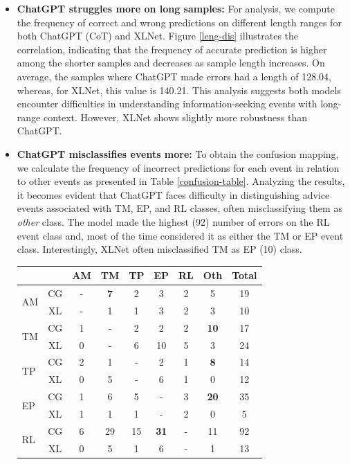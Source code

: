 \documentclass[letterpaper]{article} %
\begin{document}
\begin{itemize}
\item \textbf{ChatGPT struggles more on long samples:} For analysis, we compute the frequency of correct and wrong predictions on different length ranges for both ChatGPT (CoT) and XLNet. Figure \ref{leng-dis} illustrates the correlation, indicating that the frequency of accurate prediction is higher among the shorter samples and decreases as sample length increases. On average, the samples where ChatGPT made errors had a length of 128.04, whereas, for XLNet, this value is 140.21. This analysis suggests both models encounter difficulties in understanding information-seeking events with long-range context. However, XLNet shows slightly more robustness than ChatGPT. 

\item \textbf{ChatGPT misclassifies events more:} To obtain the confusion mapping, we calculate the frequency of incorrect predictions for each event in relation to other events as presented in Table \ref{confusion-table}. Analyzing the results, it becomes evident that ChatGPT faces difficulty in distinguishing advice events associated with TM, EP, and RL classes, often misclassifying them as \textit{other} class. The model made the highest (92) number of errors on the RL event class and, most of the time considered it as either the TM or EP event class. Interestingly, XLNet often misclassified TM as EP (10) class.   

\begin{table}[h!]
\renewcommand*{\arraystretch}{0.91}
\centering
\footnotesize
\begin{tabular}
{lc|cccccc|c}
& &{\textbf{AM}}& {\textbf{TM}}& {\textbf{TP}} & {\textbf{EP}} & {\textbf{RL}} & \textbf{Oth} & Total\\
\midrule        
 \multirow{2}{*}{AM} & CG &-  & \textbf{7} & 2 & 3 & 2 & 5 & 19\\
 & XL & - & 1 & 1 & 3 & 2 & 3 & 10 \\
\midrule

 \multirow{2}{*}{TM} &CG & 1 & - & 2 & 2 & 2 & \textbf{10} & 17\\
 & XL& 0 & - & 6 & {10} & 5 & 3 & {24} \\

\midrule
 \multirow{2}{*}{TP} &CG & 2 & 1 & - & 2 & 1 & \textbf{8}  & 14\\
&XL & 0 & 5 & - & 6 & 1 & 0 & 12 \\
\midrule
 \multirow{2}{*}{EP} &CG & 1 & 6 & 5 & - & 3 & \textbf{20} & 35\\
& XL & 1 & 1 & 1 & - & 2 & 0 & 5 \\
\midrule
 \multirow{2}{*}{RL} &CG & 6 & 29 & 15 & \textbf{31} & - & 11 & 92\\
&XL & 0 & 5 & 1 & 6 & - & 1 & 13 \\


\end{tabular}
\end{table}
\end{itemize}
\end{document}
